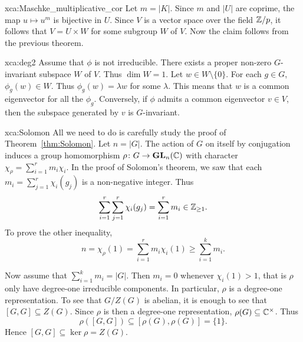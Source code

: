 \begin{sol}{xca:Maschke_multiplicative_cor}
    Let $m=|K|$. Since $m$ and $|U|$ are coprime, the map 
    $u\mapsto u^m$ is bijective in $U$. Since $V$ is a vector space over the field 
    $\mathbb{Z}/p$, it follows that $V=U\times W$ for some subgroup $W$ of $V$. Now the claim follows
    from the previous theorem. 
\end{sol}

\begin{sol}{xca:deg2}
  Assume that $\phi$ is not irreducible. There exists a proper non-zero $G$-invariant 
  subspace $W$ of $V$. Thus $\dim W=1$. Let $w\in W\setminus\{0\}$.
  For each $g\in G$, $\phi_g(w)\in W$. Thus $\phi_g(w)=\lambda w$ for some 
  $\lambda$. This means that $w$ is a common eigenvector for all the $\phi_g$.
  Conversely, if $\phi$ admits a common eigenvector $v\in V$, then 
  the subspace generated by $v$ is $G$-invariant.
\end{sol}

\begin{sol}{xca:Solomon}
    All we need to do is carefully study the proof
    of Theorem~\ref{thm:Solomon}. Let $n=|G|$. 
    The action of $G$ on itself by conjugation induces a group homomorphism $\rho\colon G\to\mathbf{GL}_n(\mathbb{C})$ with character 
    $\chi_\rho=\sum_{i=1}^rm_i\chi_i$. In the proof of 
    Solomon's theorem, we saw that 
    each $m_i=\sum_{j=1}^r\chi_i(g_j)$ is a non-negative integer. Thus 
    \[
    \sum_{i=1}^r\sum_{j=1}^r\chi_i(g_j)=\sum_{i=1}^rm_i\in\mathbb{Z}_{\geq1}. 
    \]
    To prove the other inequality, 
    \[
    n=\chi_\rho(1)=\sum_{i=1}^rm_i\chi_i(1)\geq\sum_{i=1}^km_i.
    \]

    Now assume that $\sum_{i=1}^km_i=|G|$. Then $m_i=0$ whenever 
    $\chi_i(1)>1$, that is 
    $\rho$ only have degree-one 
    irreducible components. In particular, $\rho$ is a degree-one
    representation. To see that $G/Z(G)$ is abelian, it is enough to see that $[G,G]\subseteq Z(G)$. Since $\rho$ is then
    a degree-one representation, $\rho(G)\subseteq\mathbb{C}^{\times}$. Thus 
    \[
    \rho([G,G])\subseteq [\rho(G),\rho(G)]=\{1\}.
    \]
    Hence $[G,G]\subseteq\ker\rho=Z(G)$. 
\end{sol}



